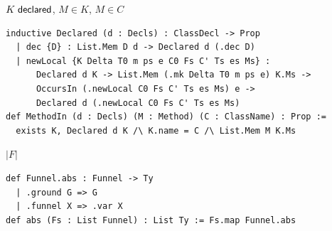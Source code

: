 \begin{cmp}{$K\mskip5mu\mathsf{declared}$, $M\in K$, $M\in C$}
\begin{paperside}
\end{paperside}
\begin{leanside}
\begin{lstlisting}[style=leanside]
inductive Declared (d : Decls) : ClassDecl -> Prop
  | dec {D} : List.Mem D d -> Declared d (.dec D)
  | newLocal {K Delta T0 m ps e C0 Fs C' Ts es Ms} :
      Declared d K -> List.Mem (.mk Delta T0 m ps e) K.Ms ->
      OccursIn (.newLocal C0 Fs C' Ts es Ms) e ->
      Declared d (.newLocal C0 Fs C' Ts es Ms)
def MethodIn (d : Decls) (M : Method) (C : ClassName) : Prop :=
  exists K, Declared d K /\ K.name = C /\ List.Mem M K.Ms
\end{lstlisting}
\end{leanside}
\end{cmp}

\begin{cmp}{$|F|$}
\begin{paperside}
\end{paperside}
\begin{leanside}
\begin{lstlisting}[style=leanside]
def Funnel.abs : Funnel -> Ty
  | .ground G => G
  | .funnel X => .var X
def abs (Fs : List Funnel) : List Ty := Fs.map Funnel.abs
\end{lstlisting}
\end{leanside}
\end{cmp}

